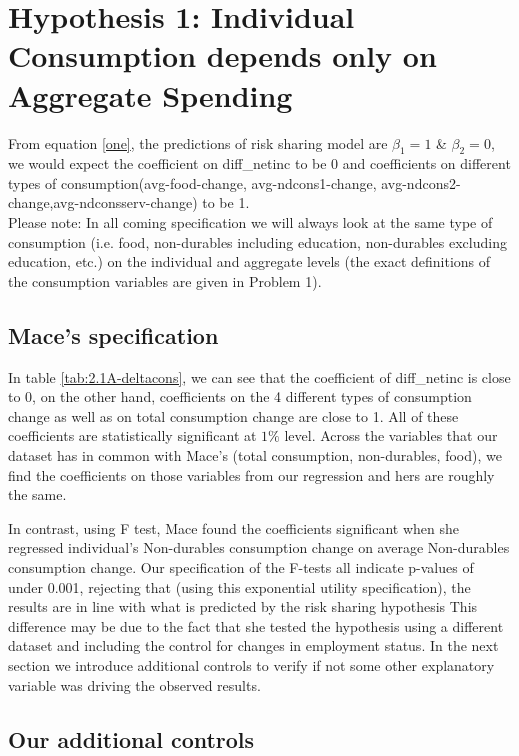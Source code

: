 \documentclass[12pt,a4paper]{article}
\begin{document}
\section*{Hypothesis 1: Individual Consumption depends only on Aggregate Spending}
From equation \eqref{one}, the predictions of risk sharing model are $\beta_1=1$ \& $\beta_2=0$, we would expect the coefficient on diff\_netinc to be 0 and coefficients on different types of consumption(avg-food-change, avg-ndcons1-change,  avg-ndcons2-change,avg-ndconsserv-change) to be 1. \\

Please note: In all coming specification we will always look at the same type of consumption (i.e. food, non-durables including education, non-durables excluding education, etc.) on the individual and aggregate levels (the exact definitions of the consumption variables are given in  Problem 1). 

\subsection*{Mace's specification}



In table \ref{tab:2.1A-deltacons}, we can see that the coefficient of diff\_netinc is close to 0, on the other hand, coefficients on the 4 different types of consumption change as well as on total consumption change are close to 1. All of these coefficients are statistically significant at $1\%$ level. Across the variables that our dataset has in common with Mace's (total consumption, non-durables, food), we find the coefficients on those variables from our regression and hers are roughly the same. 

In contrast, using F test, Mace found the coefficients significant when she regressed individual's Non-durables consumption change on average Non-durables consumption change. Our specification of the F-tests all indicate p-values of under 0.001, rejecting that (using this exponential utility specification), the results are in line with what is predicted by the risk sharing hypothesis This difference may be due to the fact that she tested the hypothesis using a different dataset and including the control for changes in employment status. In the next section we introduce additional controls to verify if not some other explanatory variable was driving the observed results.

\subsection*{Our additional controls}
\end{document}
